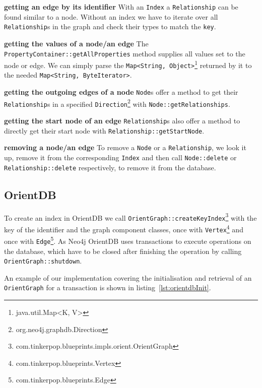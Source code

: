 \textbf{getting an edge by its identifier} \newline
With an \texttt{Index} a \texttt{Relationship} can be found similar to a node.
Without an index we have to iterate over all \texttt{Relationship}s in the graph and check their types to match the \texttt{key}.

\textbf{getting the values of a node/an edge} \newline
The \texttt{PropertyContainer::getAllProperties} method supplies all values set to the node or edge.
We can simply parse the \texttt{Map<String, Object>}\footnote{java.util.Map<K, V>} returned by it to the needed \texttt{Map<String, ByteIterator>}.

\textbf{getting the outgoing edges of a node} \newline
\texttt{Node}s offer a method to get their \texttt{Relationship}s in a specified \texttt{Direction}\footnote{org.neo4j.graphdb.Direction} with \texttt{Node::getRelationships}.

\textbf{getting the start node of an edge} \newline
\texttt{Relationship}s also offer a method to directly get their start node with \texttt{Relationship::getStartNode}.

\textbf{removing a node/an edge} \newline
To remove a \texttt{Node} or a \texttt{Relationship},
we look it up,
remove it from the corresponding \texttt{Index} and then call \texttt{Node::delete} or \texttt{Relationship::delete} respectively,
to remove it from the database.

\subsection{OrientDB}
To create an index in OrientDB we call \texttt{OrientGraph::createKeyIndex}\footnote{com.tinkerpop.blueprints.impls.orient.OrientGraph} with the key of the identifier and the graph component classes,
once with \texttt{Vertex}\footnote{com.tinkerpop.blueprints.Vertex} and once with \texttt{Edge}\footnote{com.tinkerpop.blueprints.Edge}.
As Neo4j OrientDB uses transactions to execute operations on the database,
which have to be closed after finishing the operation by calling \texttt{OrientGraph::shutdown}.

An example of our implementation covering the initialisation and retrieval of an \texttt{OrientGraph} for a transaction is shown in listing~\ref{lst:orientdbInit}.

